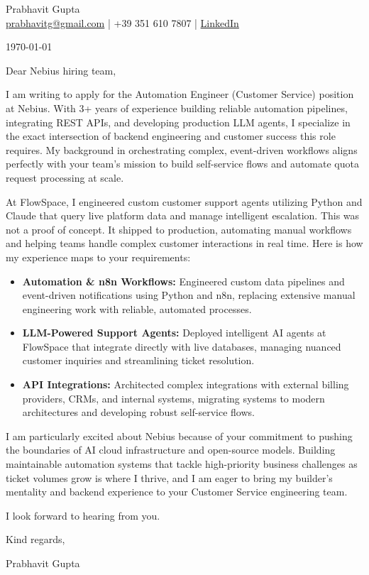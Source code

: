 \documentclass{article}\usepackage{geometry}\geometry{a4paper, margin=1in}\usepackage{hyperref}\newcommand{\namesection}[3]{\begin{center}\Huge #2\\[1ex]\large #3\end{center}\vspace{1cm}}\newcommand{\currentdate}[1]{\begin{flushright}#1\end{flushright}\vspace{0.5cm}}\newcommand{\lettercontent}[1]{#1\vspace{1ex}\par}\newcommand{\closing}[1]{#1\vspace{2cm}\par}\newcommand{\signature}[1]{#1}
\begin{document}
\namesection{}{\Huge{Prabhavit Gupta}}{  \href{mailto:prabhavitg@gmail.com}{prabhavitg@gmail.com} | +39 351 610 7807 |  \urlstyle{same}\href{https://www.linkedin.com/in/prabhavit/}{LinkedIn}
}

\currentdate{\today}
\lettercontent{Dear Nebius hiring team,}

\lettercontent{I am writing to apply for the Automation Engineer (Customer Service) position at Nebius. With 3+ years of experience building reliable automation pipelines, integrating REST APIs, and developing production LLM agents, I specialize in the exact intersection of backend engineering and customer success this role requires. My background in orchestrating complex, event-driven workflows aligns perfectly with your team's mission to build self-service flows and automate quota request processing at scale.}

\lettercontent{At FlowSpace, I engineered custom customer support agents utilizing Python and Claude that query live platform data and manage intelligent escalation. This was not a proof of concept. It shipped to production, automating manual workflows and helping teams handle complex customer interactions in real time. Here is how my experience maps to your requirements:}

{\raggedright\fontsize{11pt}{13pt}\selectfont
\begin{itemize}
    \item \textbf{Automation \& n8n Workflows:} Engineered custom data pipelines and event-driven notifications using Python and n8n, replacing extensive manual engineering work with reliable, automated processes.
    \item \textbf{LLM-Powered Support Agents:} Deployed intelligent AI agents at FlowSpace that integrate directly with live databases, managing nuanced customer inquiries and streamlining ticket resolution.
    \item \textbf{API Integrations:} Architected complex integrations with external billing providers, CRMs, and internal systems, migrating systems to modern architectures and developing robust self-service flows.
\end{itemize}\par}
\vspace{6pt}

\lettercontent{I am particularly excited about Nebius because of your commitment to pushing the boundaries of AI cloud infrastructure and open-source models. Building maintainable automation systems that tackle high-priority business challenges as ticket volumes grow is where I thrive, and I am eager to bring my builder's mentality and backend experience to your Customer Service engineering team.}

\lettercontent{I look forward to hearing from you.}

\begin{flushright}
\closing{Kind regards,}

\signature{Prabhavit Gupta}
\end{flushright}
\end{document}
